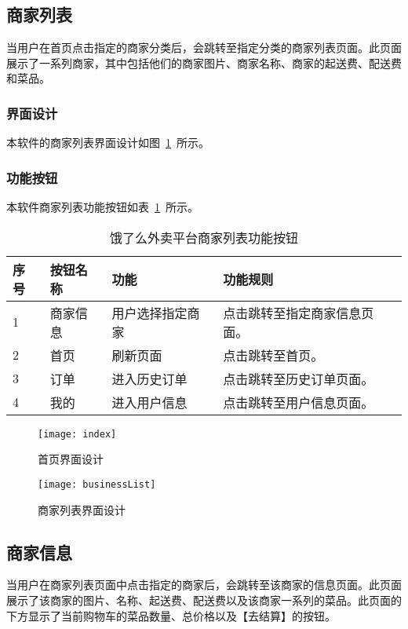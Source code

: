 \subsection{商家列表}
当用户在首页点击指定的商家分类后，会跳转至指定分类的商家列表页面。此页面展示了一系列商家，其中包括他们的商家图片、商家名称、商家的起送费、配送费和菜品。
\subsubsection{界面设计}
本软件的商家列表界面设计如图~\ref{fig:businessList}~所示。
\subsubsection{功能按钮}
本软件商家列表功能按钮如表~\ref{tab:table3}~所示。
\begin{table}[htbp]
    \caption{饿了么外卖平台商家列表功能按钮}\label{tab:table3}
    \vspace{0.5em}\wuhao
    \begin{tabularx}{\textwidth}{lllX}
    \toprule[1.5pt]
    序号 & 按钮名称 & 功能 & 功能规则 \\ 
    \midrule[1pt]
    1 & 商家信息 & 用户选择指定商家 & 点击跳转至指定商家信息页面。 \\
    2 & 首页 & 刷新页面 & 点击跳转至首页。 \\
    3 & 订单 & 进入历史订单 & 点击跳转至历史订单页面。 \\
    4 & 我的 & 进入用户信息 & 点击跳转至用户信息页面。 \\
\bottomrule[1.5pt]
\end{tabularx}
\vspace{\baselineskip}
\end{table}
\begin{figure}[htbp]
    \centering
    \begin{minipage}{0.4\textwidth}
    \centering
    \texttt{[image: index]}
    \caption{首页界面设计}\label{fig:index}
    \end{minipage}
    \begin{minipage}{0.4\textwidth}
    \centering
    \texttt{[image: businessList]}
    \caption{商家列表界面设计}\label{fig:businessList}
    \end{minipage}
    \vspace{\baselineskip}
\end{figure}

\subsection{商家信息}
当用户在商家列表页面中点击指定的商家后，会跳转至该商家的信息页面。此页面展示了该商家的图片、名称、起送费、配送费以及该商家一系列的菜品。此页面的下方显示了当前购物车的菜品数量、总价格以及【去结算】的按钮。
